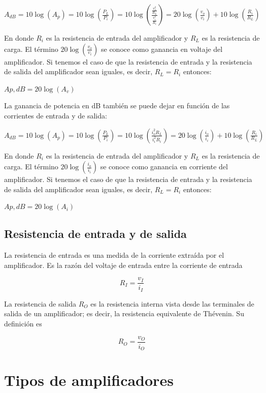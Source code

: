 \documentclass[12pt]{book}
\theoremstyle{definition}
\theoremstyle{remark}
\theoremstyle{plain}
\begin{document}
$A_{dB}=10 \log (A_p)=10 \log (\frac{P_L}{P_i})=10 \log (\frac{\frac{v^2_o}{R_L}}{\frac{v^2_i}{R_i}})=20 \log (\frac{v_o}{v_i})+10 \log (\frac{R_i}{R_L})$

En donde $R_i$  es la resistencia de entrada del amplificador y $R_L$  es la resistencia de carga. El término $20 \log (\frac{v_o}{v_i})$  se conoce como ganancia en voltaje del amplificador. Si tenemos el caso de que la resistencia de entrada y la resistencia de salida del amplificador sean iguales, es decir, $R_L=R_i$ entonces:

$A{p,dB}=20 \log (A_v)$

La ganancia de potencia en dB también se puede dejar en función de las corrientes de entrada y de salida:
 
$A_{dB}=10 \log (A_p)=10 \log (\frac{P_L}{P_i})=10 \log (\frac{i^2_o R_L}{i^2_i R_i})=20 \log (\frac{i_o}{i_i})+10 \log (\frac{R_i}{R_L})$

En donde $R_i$  es la resistencia de entrada del amplificador y $R_L$  es la resistencia de carga. El término $20 \log (\frac{i_o}{i_i})$  se conoce como ganancia en corriente del amplificador. Si tenemos el caso de que la resistencia de entrada y la resistencia de salida del amplificador sean iguales, es decir, $R_L=R_i$ entonces:

$A{p,dB}=20 \log (A_i)$

\subsection{Resistencia de entrada y de salida }
La resistencia de entrada  es una medida de la corriente extraída por el amplificador. Es la razón del voltaje de entrada entre la corriente de entrada

\begin{equation}
\label{equ7}
R_I=\frac{v_I}{i_I}
\end{equation}

La resistencia de salida  $R_O$  es la resistencia interna vista desde las terminales de salida de un amplificador; es decir, la resistencia equivalente de Thévenin. Su definición es

\begin{equation}
\label{equ8}
R_O=\frac{v_O}{i_O}
\end{equation}

\section{Tipos de amplificadores}
\end{document}
